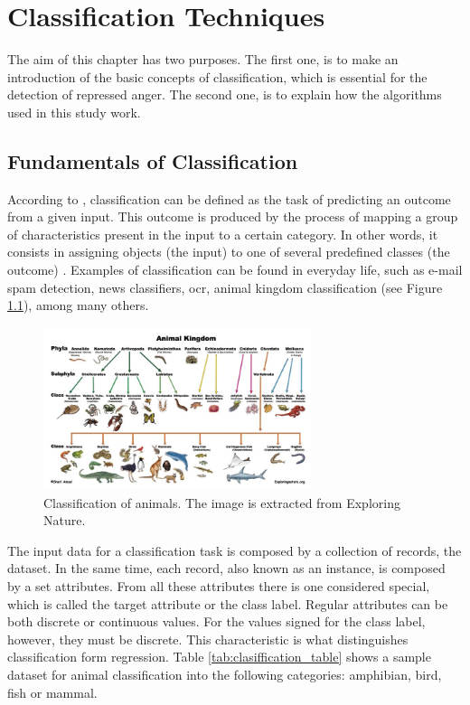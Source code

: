 
\chapter{Classification Techniques}
\label{ch:algorithms}

The aim of this chapter has two purposes. The first one, is to make an introduction of the basic concepts of classification, which is essential for the detection of repressed anger. The second one, is to explain how the algorithms used in this study work.

\section{Fundamentals of Classification}

According to \cite{voznika2007data}, classification can be defined as the task of predicting an outcome from a given input. This outcome is produced by the process of mapping a group of characteristics present in the input to a certain category. In other words, it consists in assigning objects (the input) to one of several predefined classes (the outcome) \cite{pang2006introduction}. Examples of classification can be found in everyday life, such as e-mail spam detection, news classifiers, \acrfull{ocr}, animal kingdom classification (see Figure \ref{fig:animal_classification}), among many others.

\begin{figure}[!htp]
  \center
  \includegraphics[width=0.7\textwidth]{figures/animal_classification}
  \caption{Classification of animals. The image is extracted from Exploring Nature.}
  \label{fig:animal_classification}
\end{figure}

\FloatBarrier

The input data for a classification task is composed by a collection of records, the dataset. In the same time, each record, also known as an instance, is composed by a set attributes. From all these attributes there is one considered special, which is called the target attribute or the class label. Regular attributes can be both discrete or continuous values. For the values signed for the class label, however, they must be discrete. This characteristic is what distinguishes classification form regression. Table \ref{tab:clasiffication_table} shows a sample dataset for animal classification into the following categories: amphibian, bird, fish or mammal.

